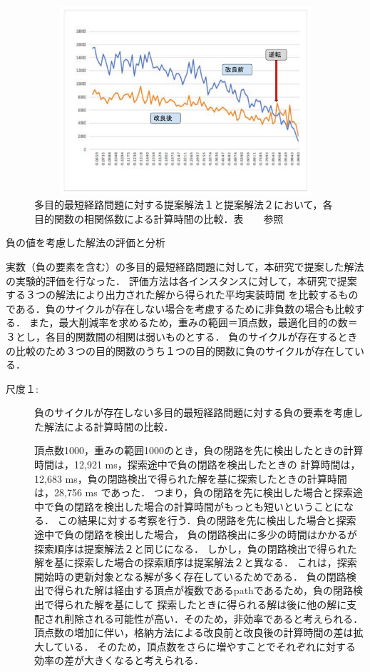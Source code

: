 \documentclass[12pt]{optlab-bachelor}
\begin{document}
\begin{figure}[htbp]
  \centering
  \includegraphics[height=7.0cm , width=15.0cm]{fig/fig18.pdf}
  \caption{多目的最短経路問題に対する提案解法１と提案解法２において，各目的関数の相関係数による計算時間の比較．表　　参照}
\end{figure}


\begin{description}
  \item[負の値を考慮した解法の評価と分析]
\end{description}

実数（負の要素を含む）の多目的最短経路問題に対して，本研究で提案した解法の実験的評価を行なった．
評価方法は各インスタンスに対して，本研究で提案する３つの解法により出力された解から得られた平均実装時間
を比較するものである．負のサイクルが存在しない場合を考慮するために非負数の場合も比較する．
また，最大削減率を求めるため，重みの範囲＝頂点数，最適化目的の数＝３とし，各目的関数間の相関は弱いものとする．
負のサイクルが存在するときの比較のため３つの目的関数のうち１つの目的関数に負のサイクルが存在している．

\begin{description}
  \item[尺度１:]
  負のサイクルが存在しない多目的最短経路問題に対する負の要素を考慮した解法による計算時間の比較．

  頂点数1000，重みの範囲1000のとき，負の閉路を先に検出したときの計算時間は，12,921 ms，探索途中で負の閉路を検出したときの
  計算時間は，12,683 ms，負の閉路検出で得られた解を基に探索したときの計算時間は，28,756 ms であった．
  つまり，負の閉路を先に検出した場合と探索途中で負の閉路を検出した場合の計算時間がもっとも短いということになる．
  この結果に対する考察を行う．負の閉路を先に検出した場合と探索途中で負の閉路を検出した場合，
  負の閉路検出に多少の時間はかかるが探索順序は提案解法２と同じになる．
  しかし，負の閉路検出で得られた解を基に探索した場合の探索順序は提案解法２と異なる．
  これは，探索開始時の更新対象となる解が多く存在しているためである．
  負の閉路検出で得られた解は経由する頂点が複数であるpathであるため，負の閉路検出で得られた解を基にして
  探索したときに得られる解は後に他の解に支配され削除される可能性が高い．そのため，非効率であると考えられる．
  頂点数の増加に伴い，格納方法による改良前と改良後の計算時間の差は拡大している．
  そのため，頂点数をさらに増やすことでそれぞれに対する効率の差が大きくなると考えられる．

\end{description}
\end{document}
